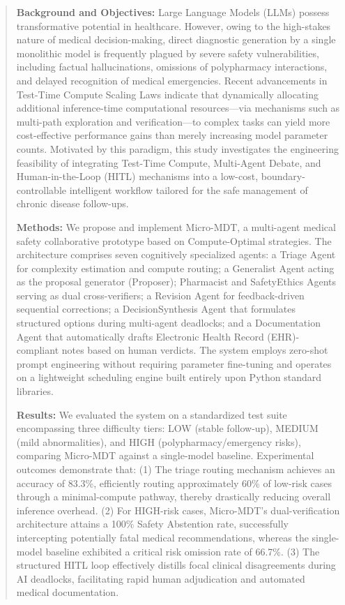 \documentclass[11pt,a4paper]{ctexart}
\begin{document}
\newpage
\renewcommand{\abstractname}{Abstract}
\begin{abstract}
\noindent \textbf{Background and Objectives:} Large Language Models (LLMs) possess transformative potential in healthcare. However, owing to the high-stakes nature of medical decision-making, direct diagnostic generation by a single monolithic model is frequently plagued by severe safety vulnerabilities, including factual hallucinations, omissions of polypharmacy interactions, and delayed recognition of medical emergencies. Recent advancements in Test-Time Compute Scaling Laws indicate that dynamically allocating additional inference-time computational resources—via mechanisms such as multi-path exploration and verification—to complex tasks can yield more cost-effective performance gains than merely increasing model parameter counts. Motivated by this paradigm, this study investigates the engineering feasibility of integrating Test-Time Compute, Multi-Agent Debate, and Human-in-the-Loop (HITL) mechanisms into a low-cost, boundary-controllable intelligent workflow tailored for the safe management of chronic disease follow-ups.

\noindent \textbf{Methods:} We propose and implement Micro-MDT, a multi-agent medical safety collaborative prototype based on Compute-Optimal strategies. The architecture comprises seven cognitively specialized agents: a Triage Agent for complexity estimation and compute routing; a Generalist Agent acting as the proposal generator (Proposer); Pharmacist and SafetyEthics Agents serving as dual cross-verifiers; a Revision Agent for feedback-driven sequential corrections; a DecisionSynthesis Agent that formulates structured options during multi-agent deadlocks; and a Documentation Agent that automatically drafts Electronic Health Record (EHR)-compliant notes based on human verdicts. The system employs zero-shot prompt engineering without requiring parameter fine-tuning and operates on a lightweight scheduling engine built entirely upon Python standard libraries.

\noindent \textbf{Results:} We evaluated the system on a standardized test suite encompassing three difficulty tiers: LOW (stable follow-up), MEDIUM (mild abnormalities), and HIGH (polypharmacy/emergency risks), comparing Micro-MDT against a single-model baseline. Experimental outcomes demonstrate that: (1) The triage routing mechanism achieves an accuracy of 83.3\%, efficiently routing approximately 60\% of low-risk cases through a minimal-compute pathway, thereby drastically reducing overall inference overhead. (2) For HIGH-risk cases, Micro-MDT's dual-verification architecture attains a 100\% Safety Abstention rate, successfully intercepting potentially fatal medical recommendations, whereas the single-model baseline exhibited a critical risk omission rate of 66.7\%. (3) The structured HITL loop effectively distills focal clinical disagreements during AI deadlocks, facilitating rapid human adjudication and automated medical documentation.


\end{abstract}
\end{document}

